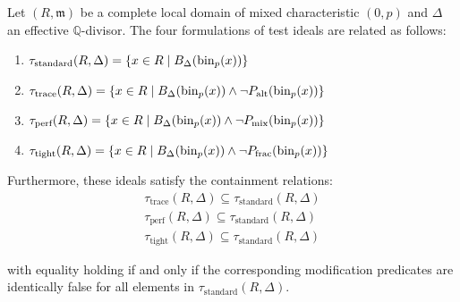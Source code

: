 \begin{theorem}\label{thm:master-unification}
Let $(R,\mathfrak{m})$ be a complete local domain of mixed characteristic $(0,p)$ and $\Delta$ an effective $\mathbb{Q}$-divisor. The four formulations of test ideals are related as follows:
\begin{enumerate}
    \item $\tau_{\text{standard}}(R,\Delta) = \{x \in R \mid B_\Delta(\operatorname{bin}_p(x))\}$
    \item $\tau_{\text{trace}}(R,\Delta) = \{x \in R \mid B_\Delta(\operatorname{bin}_p(x)) \wedge \neg P_{\text{alt}}(\operatorname{bin}_p(x))\}$
    \item $\tau_{\text{perf}}(R,\Delta) = \{x \in R \mid B_\Delta(\operatorname{bin}_p(x)) \wedge \neg P_{\text{mix}}(\operatorname{bin}_p(x))\}$
    \item $\tau_{\text{tight}}(R,\Delta) = \{x \in R \mid B_\Delta(\operatorname{bin}_p(x)) \wedge \neg P_{\text{frac}}(\operatorname{bin}_p(x))\}$
\end{enumerate}

Furthermore, these ideals satisfy the containment relations:
\begin{align}
\tau_{\text{trace}}(R,\Delta) \subseteq \tau_{\text{standard}}(R,\Delta) \\
\tau_{\text{perf}}(R,\Delta) \subseteq \tau_{\text{standard}}(R,\Delta) \\
\tau_{\text{tight}}(R,\Delta) \subseteq \tau_{\text{standard}}(R,\Delta)
\end{align}

with equality holding if and only if the corresponding modification predicates are identically false for all elements in $\tau_{\text{standard}}(R,\Delta)$.
\end{theorem}

